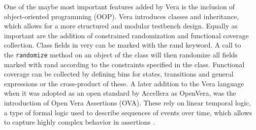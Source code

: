 \documentclass[11pt]{report}
\newcommand{\ttt}{\texttt}
\begin{document}
One of the maybe most important features added by Vera is the inclusion of object-oriented programming (OOP). Vera
introduces classes and inheritance, which allows for a more structured and modular testbench design. Equally as
important are the addition of constrained randomization and functional coverage collection. Class fields in very can
be marked with the rand keyword. A call to the \ttt{randomize} method on an object of the class will then randomize
all fields marked with rand according to the constraints specified in the class. Functional coverage can be collected
by defining bins for states, transitions and general expressions or the cross-product of these. A later addition to
the Vera language when it was adopted as an open standard by Accellera as OpenVera, was the introduction of Open Vera
Assertions (OVA). These rely on linear temporal logic, a type of formal logic used to describe sequences of events
over time, which allows to capture highly complex behavior in assertions \cite[Sec. 7]{flake2020a}.
\end{document}
